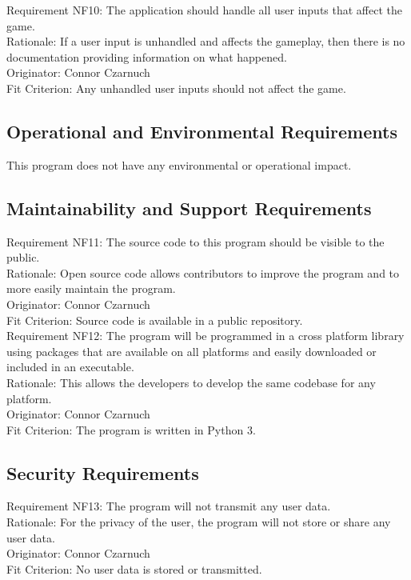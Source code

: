 \documentclass[12pt, titlepage]{article}
\begin{document}
Requirement NF10: The application should handle all user inputs that affect the game.\\
Rationale: If a user input is unhandled and affects the gameplay, then there is no documentation providing information on what happened.\\
Originator: Connor Czarnuch\\
Fit Criterion: Any unhandled user inputs should not affect the game.

\subsection{Operational and Environmental Requirements}

This program does not have any environmental or operational impact.

\subsection{Maintainability and Support Requirements}

Requirement NF11: The source code to this program should be visible to the public.\\
Rationale: Open source code allows contributors to improve the program and to more easily maintain the program.\\
Originator: Connor Czarnuch\\
Fit Criterion: Source code is available in a public repository.\\

Requirement NF12: The program will be programmed in a cross platform library using packages that are available on all platforms and easily downloaded or included in an executable.\\
Rationale: This allows the developers to develop the same codebase for any platform.\\
Originator: Connor Czarnuch\\
Fit Criterion: The program is written in Python 3.

\subsection{Security Requirements}

Requirement NF13: The program will not transmit any user data.\\
Rationale: For the privacy of the user, the program will not store or share any user data.\\
Originator: Connor Czarnuch\\
Fit Criterion: No user data is stored or transmitted.
\end{document}
